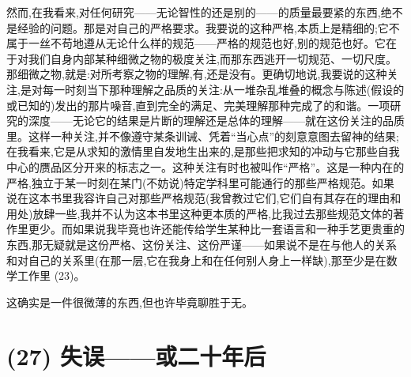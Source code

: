 然而,在我看来,对任何研究——无论智性的还是别的——的质量最要紧的东西,绝不是经验的问题。那是对自己的严格要求。我要说的这种严格,本质上是精细的;它不属于一丝不苟地遵从无论什么样的规范——严格的规范也好,别的规范也好。它在于对我们自身内部某种细微之物的极度关注,而那东西逃开一切规范、一切尺度。那细微之物,就是:对所考察之物的理解,有,还是没有。更确切地说,我要说的这种关注,是对每一时刻当下那种理解之品质的关注:从一堆杂乱堆叠的概念与陈述(假设的或已知的)发出的那片噪音,直到完全的满足、完美理解那种完成了的和谐。一项研究的深度——无论它的结果是片断的理解还是总体的理解——就在这份关注的品质里。这样一种关注,并不像遵守某条训诫、凭着“当心点”的刻意意图去留神的结果;在我看来,它是从求知的激情里自发地生出来的,是那些把求知的冲动与它那些自我中心的赝品区分开来的标志之一。这种关注有时也被叫作“严格”。这是一种内在的严格,独立于某一时刻在某门(不妨说)特定学科里可能通行的那些严格规范。如果说在这本书里我容许自己对那些严格规范(我曾教过它们,它们自有其存在的理由和用处)放肆一些,我并不认为这本书里这种更本质的严格,比我过去那些规范文体的著作里更少。而如果说我毕竟也许还能传给学生某种比一套语言和一种手艺更贵重的东西,那无疑就是这份严格、这份关注、这份严谨——如果说不是在与他人的关系和对自己的关系里(在那一层,它在我身上和在任何别人身上一样缺),那至少是在数学工作里 (23)。

这确实是一件很微薄的东西,但也许毕竟聊胜于无。

\section{(27) 失误——或二十年后}

